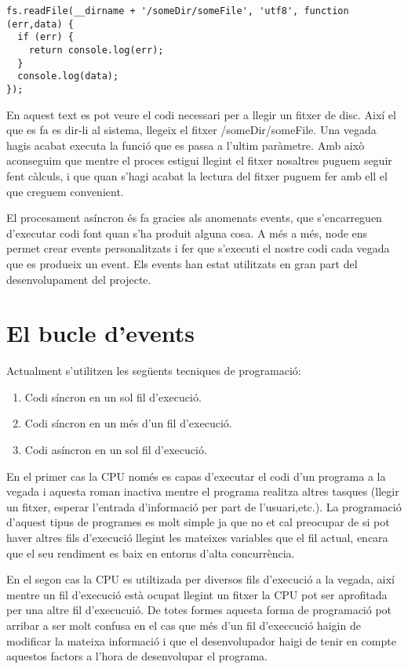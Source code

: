 \begin{lstlisting}
fs.readFile(__dirname + '/someDir/someFile', 'utf8', function (err,data) {
  if (err) {
    return console.log(err);
  }
  console.log(data);
});
\end{lstlisting}

En aquest text es pot veure el codi necessari per a llegir un fitxer de disc. Així el que es fa es dir-li al sistema, llegeix el fitxer /someDir/someFile. Una vegada hagis acabat executa la funció que es passa a l'ultim paràmetre. Amb això aconseguim que mentre el proces estigui llegint el fitxer nosaltres puguem seguir fent càlculs, i que quan s'hagi acabat la lectura del fitxer puguem fer amb ell el que creguem convenient. 

El procesament asíncron és fa gracies als anomenats events, que s'encarreguen d'executar codi font quan s'ha produit alguna cosa. A més a més, node ens permet crear events personalitzats i fer que s'executi el nostre codi cada vegada que es produeix un event. Els events han estat utilitzats en gran part del desenvolupament del projecte. 

\section{El bucle d'events}

Actualment s'utilitzen les següents tecniques de programació: 

\begin{enumerate}
    \item{Codi síncron en un sol fil d'execució.}
    \item{Codi síncron en un més d'un fil d'execució.}
    \item{Codi asíncron en un sol fil d'execució.}
\end{enumerate}

En el primer cas la CPU només es capas d'executar el codi d'un programa a la vegada i aquesta roman inactiva mentre el programa realitza altres tasques (llegir un fitxer, esperar l'entrada d'informació per part de l'usuari,etc.). La programació d'aquest tipus de programes es molt simple ja que no et cal preocupar de si pot haver altres fils d'execució llegint les mateixes variables que el fil actual, encara que el seu rendiment es baix en entorns d'alta concurrència. 

En el segon cas la CPU es utiltizada per diversos fils d'execució a la vegada, així mentre un fil d'execució està ocupat llegint un fitxer la CPU pot ser aprofitada per una altre fil d'execucuió. De totes formes aquesta forma de programació pot arribar a ser molt confusa en el cas que més d'un fil d'execcució haigin de modificar la mateixa informació i que el desenvolupador haigi de tenir en compte aquestos factors a l'hora de desenvolupar el programa. 

